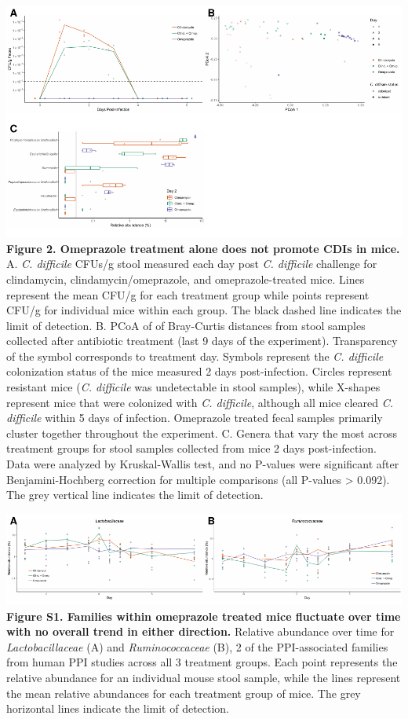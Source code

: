 \documentclass[11pt,]{article}
\begin{document}
\newpage

\includegraphics{figure_2.pdf} \textbf{Figure 2. Omeprazole treatment
alone does not promote CDIs in mice.} A. \emph{C. difficile} CFUs/g
stool measured each day post \emph{C. difficile} challenge for
clindamycin, clindamycin/omeprazole, and omeprazole-treated mice. Lines
represent the mean CFU/g for each treatment group while points represent
CFU/g for individual mice within each group. The black dashed line
indicates the limit of detection. B. PCoA of of Bray-Curtis distances
from stool samples collected after antibiotic treatment (last 9 days of
the experiment). Transparency of the symbol corresponds to treatment
day. Symbols represent the \emph{C. difficile} colonization status of
the mice measured 2 days post-infection. Circles represent resistant
mice (\emph{C. difficile} was undetectable in stool samples), while
X-shapes represent mice that were colonized with \emph{C. difficile},
although all mice cleared \emph{C. difficile} within 5 days of
infection. Omeprazole treated fecal samples primarily cluster together
throughout the experiment. C. Genera that vary the most across treatment
groups for stool samples collected from mice 2 days post-infection. Data
were analyzed by Kruskal-Wallis test, and no P-values were significant
after Benjamini-Hochberg correction for multiple comparisons (all
P-values \textgreater{} 0.092). The grey vertical line indicates the
limit of detection.

\newpage

\includegraphics{figure_s1.pdf} \textbf{Figure S1. Families within
omeprazole treated mice fluctuate over time with no overall trend in
either direction.} Relative abundance over time for
\emph{Lactobacillaceae} (A) and \emph{Ruminococcaceae} (B), 2 of the
PPI-associated families from human PPI studies across all 3 treatment
groups. Each point represents the relative abundance for an individual
mouse stool sample, while the lines represent the mean relative
abundances for each treatment group of mice. The grey horizontal lines
indicate the limit of detection.
\end{document}
